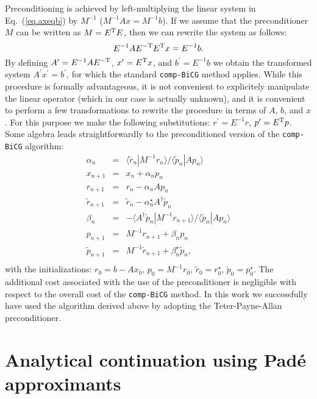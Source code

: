 \documentclass[twocolumn,prb,showpacs,superscriptaddress]{revtex4}
\def\>{\rangle}
\def\<{\langle}
\def\rt{\tilde{r}}
\def\pt{\tilde{p}}
\begin{document}
Preconditioning is achieved by left-multiplying the linear system in Eq.\ (\ref{eq.axeqb}) 
by $M^{-1}$ ($M^{-1}Ax=M^{-1}b$). If we assume that the preconditioner $M$ can be 
written as $M=E^{\rm T}E$, then we can rewrite the system as follows:
  \begin{equation}
  E^{-1}AE^{-{\rm T}} E^{\rm T}x = E^{-1}b.
  \end{equation}
By defining $A^\prime=E^{-1}AE^{-{\rm T}}$, $x^\prime=E^{\rm T}x$, and $b^\prime=E^{-1}b$
we obtain the transformed system $A^\prime x^\prime=b^\prime$, for which the
standard {\tt comp-BiCG} method applies.
While this procedure is formally advantageous, it is not convenient to explicitely
manipulate the linear operator (which in our case is actually unknown), and it is
convenient to perform a few transformations to rewrite the procedure in terms of
$A$, $b$, and $x$. For this purpose we make the following substitutions:
$r^\prime = E^{-1}r$, $p^\prime=E^{\rm T} p$. Some algebra leads straightforwardly
to the preconditioned version of the {\tt comp-BiCG} algorithm:
  \begin{eqnarray}
  \alpha_n & = & \<\rt_n|M^{-1}r_n\>/\<\pt_n|Ap_n\> \nonumber \\ \nonumber
  x_{n+1} & = & x_n + \alpha_n p_n \\ \nonumber
  r_{n+1} & = & r_n - \alpha_n Ap_n \\ \nonumber
  \rt_{n+1} & = & \rt_n - \alpha_n^\star A^\dagger \pt_n \\ \nonumber
  \beta_n & = & - \<A^\dagger\pt_n|M^{-1}r_{n+1}\>/\<\pt_n|Ap_n\> \\ \nonumber
  p_{n+1} & = & M^{-1}r_{n+1} + \beta_n p_n \\ \nonumber
  \pt_{n+1} & = & M^{-1}\rt_{n+1} + \beta_n^\star \pt_n, \\ \nonumber
  \end{eqnarray}
with the initializations: $r_0=b-Ax_0$, $p_0=M^{-1}r_0$, $\rt_0=r_0^\star$,
$\pt_0=p_0^\star$.
The additional cost associated with the use of the preconditioner is negligible
with respect to the overall cost of the {\tt comp-BiCG} method.
In this work we successfully have used the algorithm derived above by adopting the
Teter-Payne-Allan preconditioner.\cite{tpa}

\section{Analytical continuation using Pad\'e approximants}
\end{document}

